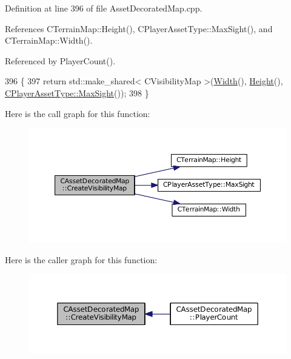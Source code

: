 Definition at line 396 of file Asset\+Decorated\+Map.\+cpp.



References C\+Terrain\+Map\+::\+Height(), C\+Player\+Asset\+Type\+::\+Max\+Sight(), and C\+Terrain\+Map\+::\+Width().



Referenced by Player\+Count().


\begin{DoxyCode}
396                                                                              \{
397     \textcolor{keywordflow}{return} std::make\_shared< CVisibilityMap >(\hyperlink{classCTerrainMap_a34cb754aa9b26e85a73377159f2527d7}{Width}(), \hyperlink{classCTerrainMap_ae5e4bf6507e0e3e9ac0322b43eed8a7a}{Height}(), 
      \hyperlink{classCPlayerAssetType_a1c1648ef0fdd2d112508c2ef9b7b70d1}{CPlayerAssetType::MaxSight}());
398 \}
\end{DoxyCode}
Here is the call graph for this function\+:\nopagebreak
\begin{figure}[H]
\begin{center}
\leavevmode
\includegraphics[width=350pt]{classCAssetDecoratedMap_aa05e81ec37b4217053e8de050e47dba7_cgraph}
\end{center}
\end{figure}
Here is the caller graph for this function\+:\nopagebreak
\begin{figure}[H]
\begin{center}
\leavevmode
\includegraphics[width=350pt]{classCAssetDecoratedMap_aa05e81ec37b4217053e8de050e47dba7_icgraph}
\end{center}
\end{figure}
\hypertarget{classCAssetDecoratedMap_a9d0fa2b32e4e8add6da83a7ebcfab6d8}{}\label{classCAssetDecoratedMap_a9d0fa2b32e4e8add6da83a7ebcfab6d8} 
